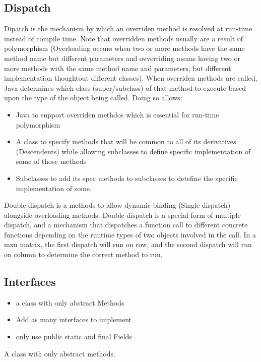 \documentclass[a4paper, 11pt]{article}
\begin{document}
    \subsection{Dispatch}
        Dipatch is the mechanism by which an overriden method is resolved at run-time instead of compile time.  Note that overridden methods usually are a result of polymorphism (Overloading occurs when two or more methods have the same method name but different parameters and ovverriding means having two or more methods with the same method name and parameters, but different implementation thoughtout different classes).
        \newline\newline
        When overriden methods are called, Java determines which class (super/subclass) of that method to execute based upon the type of the object being called.  Doing so allows:
        \begin{itemize}
            \item Java to support overriden methdos which is essential for run-time polymorphism
            \item A class to specify methods that will be common to all of its derivatives (Descendents) while allowing subclasses to define specific implementation of some of those methods
            \item Subclasses to add its spec methods to subclasses to detefine the specific implementation of some.
        \end{itemize}
        Double dispatch is a methods to allow dynamic binding (Single dispatch) alongside overloading methods.
        \newline\newline
        Double dispatch is a special form of multiple dispatch, and a mechanism that dispatches a function call to different concrete functions depending on the runtime types of two objects involved in the call. In a mxn matrix, the first dispatch will run on row, and the second dispatch will run on column to determine the correct method to run.

    \subsection{Interfaces}
        \begin{itemize}
            \item a class with only abstract Methods
            \item Add as many interfaces to implement
            \item only use public static and final Fields
        \end{itemize}
        A class with only abstract methods.
\end{document}
